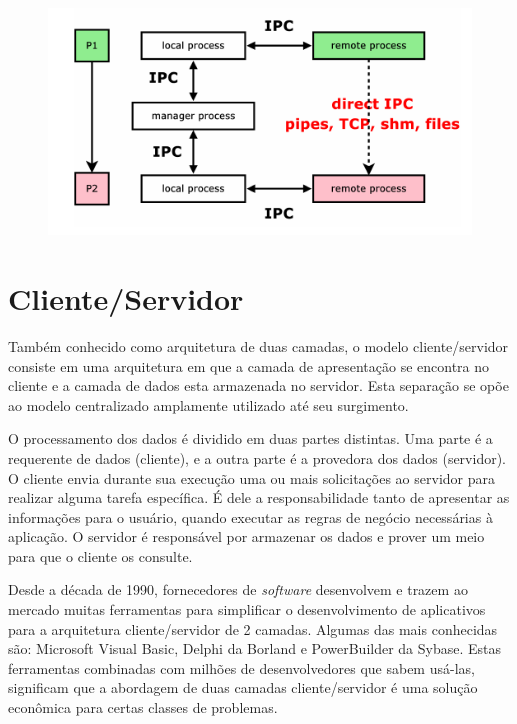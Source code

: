 \begin{figure}[htbp]
    \centering
    \includegraphics[width=1\textwidth]{figuras/ipc.png}
    \label{fig:how-communication-works}
\end{figure}

\section{Cliente/Servidor}\label{sec:clientserver}

Também conhecido como arquitetura de duas camadas, o modelo cliente/servidor consiste em uma arquitetura em que a camada de apresentação se encontra no cliente e a camada de dados esta armazenada no servidor. Esta separação se opõe ao modelo centralizado amplamente utilizado até seu surgimento.

O processamento dos dados é dividido em duas partes distintas. Uma parte é a requerente de dados (cliente), e a outra parte é a provedora dos dados (servidor). O cliente envia durante sua execução uma ou mais solicitações ao servidor para realizar alguma tarefa específica. É dele a responsabilidade tanto de apresentar as informações para o usuário, quando executar as regras de negócio necessárias à aplicação. O servidor é responsável por armazenar os dados e prover um meio para que o cliente os consulte.

Desde a década de 1990, fornecedores de \textit{software} desenvolvem e trazem ao mercado muitas ferramentas para simplificar o desenvolvimento de aplicativos para a arquitetura cliente/servidor de 2 camadas. Algumas das mais conhecidas são: Microsoft Visual Basic, Delphi da Borland e PowerBuilder da Sybase. Estas ferramentas combinadas com milhões de desenvolvedores que sabem usá-las, significam que a abordagem de duas camadas cliente/servidor é uma solução econômica para certas classes de problemas.


